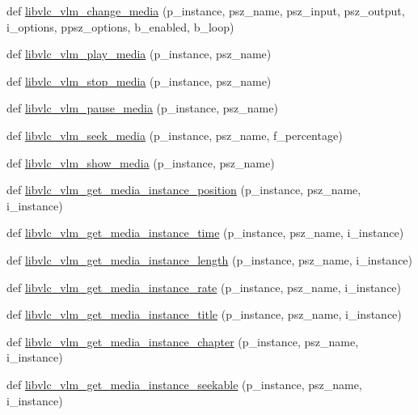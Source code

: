 \begin{DoxyCompactItemize}
\item 
def \hyperlink{namespacevlc_ad4124336e48ffb5c6aef3bd166c3ff77}{libvlc\+\_\+vlm\+\_\+change\+\_\+media} (p\+\_\+instance, psz\+\_\+name, psz\+\_\+input, psz\+\_\+output, i\+\_\+options, ppsz\+\_\+options, b\+\_\+enabled, b\+\_\+loop)
\item 
def \hyperlink{namespacevlc_ab243eae217981fa16592409c1d5b9caa}{libvlc\+\_\+vlm\+\_\+play\+\_\+media} (p\+\_\+instance, psz\+\_\+name)
\item 
def \hyperlink{namespacevlc_a9ad79a1cc59f030bc4dbbfaa8ca7924e}{libvlc\+\_\+vlm\+\_\+stop\+\_\+media} (p\+\_\+instance, psz\+\_\+name)
\item 
def \hyperlink{namespacevlc_aaad0efdc3c62f78fc9653c58d562e323}{libvlc\+\_\+vlm\+\_\+pause\+\_\+media} (p\+\_\+instance, psz\+\_\+name)
\item 
def \hyperlink{namespacevlc_a0cdf20f1c8371b2f626c6bee76089a91}{libvlc\+\_\+vlm\+\_\+seek\+\_\+media} (p\+\_\+instance, psz\+\_\+name, f\+\_\+percentage)
\item 
def \hyperlink{namespacevlc_a23b89ca7dee175880ded4a71f076bc8a}{libvlc\+\_\+vlm\+\_\+show\+\_\+media} (p\+\_\+instance, psz\+\_\+name)
\item 
def \hyperlink{namespacevlc_ad88fbcae963bb382bafa5f582c073ed9}{libvlc\+\_\+vlm\+\_\+get\+\_\+media\+\_\+instance\+\_\+position} (p\+\_\+instance, psz\+\_\+name, i\+\_\+instance)
\item 
def \hyperlink{namespacevlc_a7cc16a54030b527e482741447ba35aef}{libvlc\+\_\+vlm\+\_\+get\+\_\+media\+\_\+instance\+\_\+time} (p\+\_\+instance, psz\+\_\+name, i\+\_\+instance)
\item 
def \hyperlink{namespacevlc_ae253451e4dd490269fe9131dbf1abebd}{libvlc\+\_\+vlm\+\_\+get\+\_\+media\+\_\+instance\+\_\+length} (p\+\_\+instance, psz\+\_\+name, i\+\_\+instance)
\item 
def \hyperlink{namespacevlc_a27709abc252d4ddc97dc2ea272a85acf}{libvlc\+\_\+vlm\+\_\+get\+\_\+media\+\_\+instance\+\_\+rate} (p\+\_\+instance, psz\+\_\+name, i\+\_\+instance)
\item 
def \hyperlink{namespacevlc_aa50fef0c1e8a8a03f23275fca6642a1e}{libvlc\+\_\+vlm\+\_\+get\+\_\+media\+\_\+instance\+\_\+title} (p\+\_\+instance, psz\+\_\+name, i\+\_\+instance)
\item 
def \hyperlink{namespacevlc_a6f3929a65f89f072354d79c5000a8651}{libvlc\+\_\+vlm\+\_\+get\+\_\+media\+\_\+instance\+\_\+chapter} (p\+\_\+instance, psz\+\_\+name, i\+\_\+instance)
\item 
def \hyperlink{namespacevlc_aeb4b8ac59f98ba964d1963665404ee8d}{libvlc\+\_\+vlm\+\_\+get\+\_\+media\+\_\+instance\+\_\+seekable} (p\+\_\+instance, psz\+\_\+name, i\+\_\+instance)

\end{DoxyCompactItemize}
